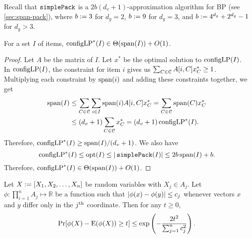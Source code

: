Recall that $\operatorname{\mathtt{simplePack}}$ is a $2b(d_v+1)$-approximation algorithm for  BP
(see \cref{sec:span-pack}), where $b := 3$ for $d_g=2$,
$b := 9$ for $d_g=3$, and $b := 4^{d_g}+2^{d_g}-1$ for $d_g > 3$.

\begin{lemma}
\label{thm:clp-vs-span}
For a set $I$ of  items,
$\operatorname{configLP}^*(I) \in \Theta(\operatorname{span}(I)) + O(1)$.
\end{lemma}
\begin{proof}
Let $A$ be the \config{} matrix of $I$.
Let $x^*$ be the optimal solution to $\operatorname{configLP}(I)$.
In $\operatorname{configLP}(I)$, the constraint for item $i$ gives us
$\sum_{C \in \mathcal{C}} A[i, C] x^*_C \ge 1$.
Multiplying each constraint by $\operatorname{span}(i)$ and adding these constraints together, we get
\begin{align*}
\operatorname{span}(I) &\le \sum_{C \in \mathcal{C}} \sum_{i \in I} \operatorname{span}(i) A[i, C] x^*_C
= \sum_{C \in \mathcal{C}} \operatorname{span}(C) x^*_C
\\ &\le (d_v+1) \sum_{C \in \mathcal{C}} x^*_C = (d_v+1)\operatorname{configLP}^*(I).
\end{align*}
Therefore, $\operatorname{configLP}^*(I) \ge \operatorname{span}(I)/(d_v+1)$.
We also have
\[ \operatorname{configLP}^*(I) \le \operatorname{opt}(I) \le |\operatorname{\mathtt{simplePack}}(I)| \le 2b\operatorname{span}(I)+b. \]
Therefore, $\operatorname{configLP}^*(I) \in \Theta(\operatorname{span}(I)) + O(1)$.
\end{proof}

\begin{lemma}
\label{thm:ind-bdi}
Let $X := [X_1, X_2, \ldots, X_n]$ be random variables with $X_j \in A_j$.
Let $\phi: \prod_{i=1}^n A_j \mapsto \mathbb{R}$ be a function such that
$\left\lvert \phi(x) - \phi(y) \right\rvert \le c_j$
whenever vectors $x$ and $y$ differ only in the $j^{\textrm{th}}$ coordinate.
Then for any $t \ge 0$,
\[ \Pr[ \phi(X) - \operatorname*{E}(\phi(X)) \ge t ] \le \exp\left(-\frac{2t^2}{\sum_{j=1}^n c_j^2}\right). \]
\end{lemma}

